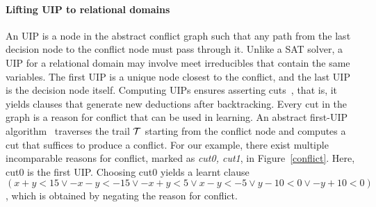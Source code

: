 \paragraph {\textbf{Lifting UIP to relational domains}}
An UIP is a node in the abstract conflict graph such that 
any path from the last decision node to the conflict node must pass 
through it.  Unlike a SAT solver, a UIP for a relational domain may 
involve meet irreducibles that contain the same variables.  The 
first UIP is a unique node closest to the conflict, and the last UIP 
is the decision node itself.  Computing UIPs ensures asserting
cuts~\cite{cdcl,DBLP:journals/fmsd/BrainDGHK14}, that is, it 
yields clauses that generate new deductions after backtracking.  
Every cut in the graph is a reason for conflict that can be 
used in learning.  An abstract first-UIP algorithm~\cite{DBLP:journals/fmsd/BrainDGHK14} 
traverses the trail $\mathcal{T}$ starting from the conflict node and 
computes a cut that suffices to produce a conflict. 
For our example, there exist multiple incomparable reasons for conflict,
marked as {\em cut0, cut1}, in Figure~\ref{conflict}.  Here, cut0 is the first UIP.  
Choosing cut0 yields a learnt clause 
$(x+y<15 \vee -x-y<-15 \vee -x+y<5 \vee x-y<-5 \vee y-10<0 \vee -y+10<0)$, 
which is obtained by negating the reason for conflict.  
%    
